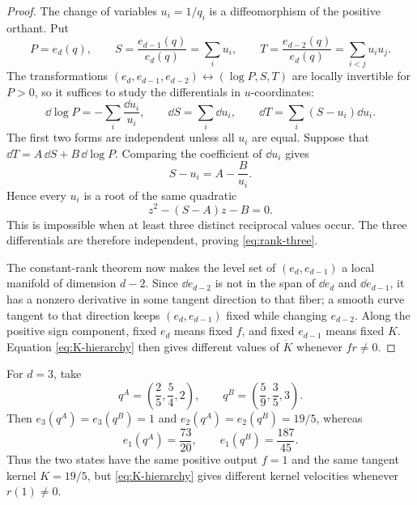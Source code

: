 \begin{proof}
The change of variables $u_i=1/q_i$ is a diffeomorphism of the positive orthant.  Put
\begin{equation}
  P=e_d(q),
  \qquad
  S=\frac{e_{d-1}(q)}{e_d(q)}=\sum_i u_i,
  \qquad
  T=\frac{e_{d-2}(q)}{e_d(q)}=\sum_{i<j}u_i u_j.
  \label{eq:reciprocal-coordinates}
\end{equation}
The transformations $(e_d,e_{d-1},e_{d-2})\leftrightarrow(\log P,S,T)$ are locally invertible for $P>0$, so it suffices to study the differentials in $u$-coordinates:
\begin{equation}
  \dd\log P=-\sum_i\frac{\dd u_i}{u_i},
  \qquad
  \dd S=\sum_i\dd u_i,
  \qquad
  \dd T=\sum_i(S-u_i)\dd u_i.
  \label{eq:three-differentials}
\end{equation}
The first two forms are independent unless all $u_i$ are equal.  Suppose that $\dd T=A\,\dd S+B\,\dd\log P$.  Comparing the coefficient of $\dd u_i$ gives
\begin{equation}
  S-u_i=A-\frac{B}{u_i}.
\end{equation}
Hence every $u_i$ is a root of the same quadratic
\begin{equation}
  z^2-(S-A)z-B=0.
\end{equation}
This is impossible when at least three distinct reciprocal values occur.  The three differentials are therefore independent, proving \eqref{eq:rank-three}.

The constant-rank theorem now makes the level set of $(e_d,e_{d-1})$ a local manifold of dimension $d-2$.  Since $\dd e_{d-2}$ is not in the span of $\dd e_d$ and $\dd e_{d-1}$, it has a nonzero derivative in some tangent direction to that fiber; a smooth curve tangent to that direction keeps $(e_d,e_{d-1})$ fixed while changing $e_{d-2}$.  Along the positive sign component, fixed $e_d$ means fixed $f$, and fixed $e_{d-1}$ means fixed $K$.  Equation \eqref{eq:K-hierarchy} then gives different values of $\dot K$ whenever $fr\neq0$.
\end{proof}

\begin{remark*}
For $d=3$, take
\[
  q^A=\left(\frac25,\frac54,2\right),
  \qquad
  q^B=\left(\frac59,\frac35,3\right).
\]
Then $e_3(q^A)=e_3(q^B)=1$ and $e_2(q^A)=e_2(q^B)=19/5$, whereas
\[
  e_1(q^A)=\frac{73}{20},
  \qquad
  e_1(q^B)=\frac{187}{45}.
\]
Thus the two states have the same positive output $f=1$ and the same tangent kernel $K=19/5$, but \eqref{eq:K-hierarchy} gives different kernel velocities whenever $r(1)\neq0$.
\end{remark*}

